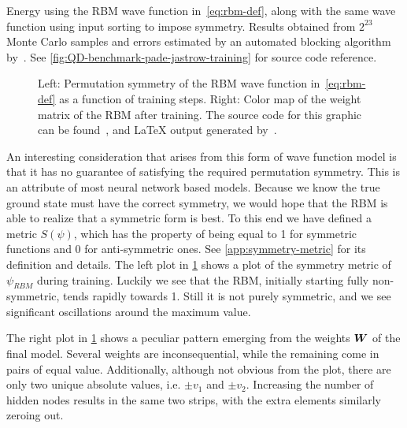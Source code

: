 \documentclass[Thesis.tex]{subfiles}
\begin{document}
\begin{table}[h]
  \centering
  
  \caption{Energy using the RBM wave function in~\cref{eq:rbm-def}, along with
the same wave function using input sorting to impose symmetry. Results obtained
from $2^{23}$ Monte Carlo samples and errors estimated by an automated blocking
algorithm by~\textcite{Jonsson-2018}. See
\cref{fig:QD-benchmark-pade-jastrow-training} for source code reference.}
  \label{tab:rbm-energy-results}
\end{table}

\begin{figure}[h]
   \centering
    \resizebox{\linewidth}{!}{%
        
    }
    \caption{\label{fig:QD-rbm-symmetry}Left: Permutation symmetry of the RBM wave
function in~\cref{eq:rbm-def} as a function of training steps. Right: Color map
of the weight matrix of the RBM after training. The source code for this graphic
can be found~\cite[TODO: Add path]{MS-thesis-repository}, and \LaTeX{} output
generated by~\cite{nico_schlomer_2018_1173090}.}
\end{figure}

An interesting consideration that arises from this form of wave function model
is that it has no guarantee of satisfying the required permutation symmetry.
This is an attribute of most neural network based models. Because we know the
true ground state must have the correct symmetry, we would hope that the RBM is
able to realize that a symmetric form is best. To this end we have defined a
metric $S(\psi)$, which has the property of being equal to 1 for symmetric
functions and $0$ for anti-symmetric ones. See \cref{app:symmetry-metric} for
its definition and details. The left plot in \cref{fig:QD-rbm-symmetry} shows a
plot of the symmetry metric of $\psi_{RBM}$ during training. Luckily we see
that the RBM, initially starting fully non-symmetric, tends rapidly towards 
1. Still it is not purely symmetric, and we see significant
oscillations around the maximum value.

The right plot in \cref{fig:QD-rbm-symmetry} shows a peculiar pattern emerging
from the weights $\bm{W}$ of the final model. Several weights are
inconsequential, while the remaining come in pairs of equal value. Additionally,
although not obvious from the plot, there are only two unique absolute values,
i.e. $\pm v_1$ and $\pm v_2$. Increasing the number of hidden nodes results in
the same two strips, with the extra elements similarly zeroing out. 
\end{document}
